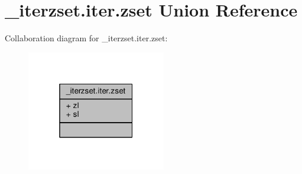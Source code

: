 \hypertarget{unionzsetopsrc_1_1__iterzset_8iter_8zset}{}\section{\+\_\+iterzset.\+iter.\+zset Union Reference}
\label{unionzsetopsrc_1_1__iterzset_8iter_8zset}


Collaboration diagram for \+\_\+iterzset.\+iter.\+zset\+:\nopagebreak
\begin{figure}[H]
\begin{center}
\leavevmode
\includegraphics[width=172pt]{unionzsetopsrc_1_1__iterzset_8iter_8zset__coll__graph}
\end{center}
\end{figure}
